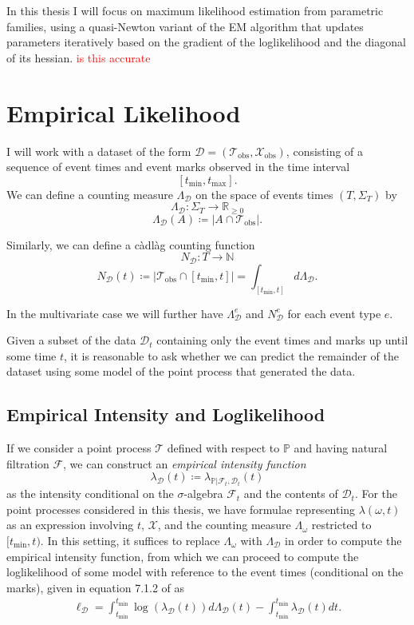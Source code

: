 \documentclass[honours,12pt]{unswthesis}
\numberwithin{equation}{section}
\begin{document}
In this thesis I will focus on maximum likelihood estimation from parametric families, using a quasi-Newton variant of the EM algorithm that updates parameters iteratively based on the gradient of the loglikelihood and the diagonal of its hessian. \textcolor{red}{is this accurate}

\section{Empirical Likelihood}
I will work with a dataset of the form $\mathcal{D} = \left(\mathcal{T}_\mathrm{obs},\mathcal{X}_\mathrm{obs}\right)$, consisting of a sequence of event times and event marks observed in the time interval $$[t_\mathrm{min},t_\mathrm{max}].$$
We can define a counting measure $\Lambda_\mathcal{D}$ on the space of events times $(T,\Sigma_T)$ by
$$\Lambda_{\mathcal{D}} : \Sigma_T \to \mathbb{R}_{\geq 0}$$
$$\Lambda_{\mathcal{D}}(A) \coloneq \left\vert A\cap\mathcal{T}_\mathrm{obs}\right\vert.$$

Similarly, we can define a càdlàg counting function
$$N_\mathcal{D} : T \to \mathbb{N}$$
$$N_\mathcal{D}(t) \coloneq \left\vert \mathcal{T}_\mathrm{obs}\cap [t_\mathrm{min},t]\right\vert = \int_{[t_\mathrm{min},t]} d\Lambda_\mathcal{D}.$$

In the multivariate case we will further have $\Lambda_\mathcal{D}^e$ and $N_\mathcal{D}^e$ for each event type $e$.

Given a subset of the data $\mathcal{D}_t$ containing only the event times and marks up until some time $t$, it is reasonable to ask whether we can predict the remainder of the dataset using some model of the point process that generated the data.

\subsection{Empirical Intensity and Loglikelihood}
If we consider a point process $\mathcal{T}$ defined with respect to $\mathbb{P}$ and having natural filtration $\mathcal{F}$, we can construct an \textit{empirical intensity function}
$$\lambda_\mathcal{D}(t) \coloneq \lambda_{\mathbb{P}\vert\mathcal{F}_t,\mathcal{D}_t}(t)$$
as the intensity conditional on the $\sigma$-algebra $\mathcal{F}_t$ and the contents of $\mathcal{D}_t$. For the point processes considered in this thesis, we have formulae representing $\lambda(\omega,t)$ as an expression involving $t$, $\mathcal{X}$, and the counting measure $\Lambda_\omega$ restricted to $[t_\mathrm{min},t)$. In this setting, it suffices to replace $\Lambda_\omega$ with $\Lambda_\mathcal{D}$ in order to compute the empirical intensity function, from which we can proceed to compute the loglikelihood of some model with reference to the event times (conditional on the marks), given in equation 7.1.2 of \cite{DaleyVereJones} as
\begin{equation}
	\begin{align}
		\ell_\mathcal{D} = \int_{t_\mathrm{min}}^{t_\mathrm{min}} \log\left(\lambda_\mathcal{D}(t)\right)d\Lambda_\mathcal{D}(t) - \int_{t_\mathrm{min}}^{t_\mathrm{min}} \lambda_\mathcal{D}(t)dt.
	\end{align}
\end{equation}
\end{document}
